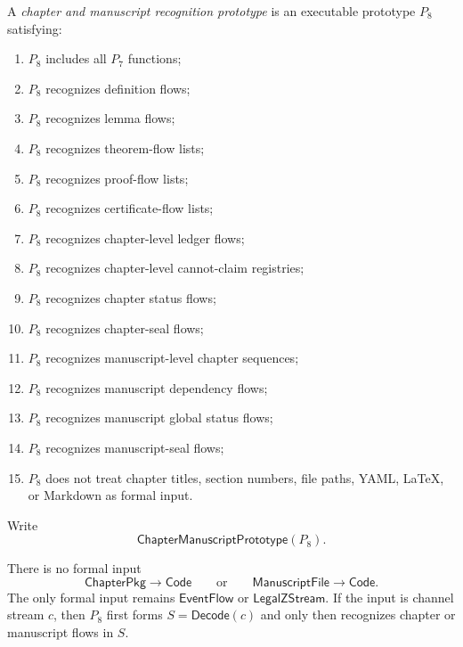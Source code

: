 \begin{definition}
\label{def:chapter-manuscript-p8-prototype}
A \emph{chapter and manuscript recognition prototype} is an executable prototype $P_8$ satisfying:
\begin{enumerate}
\item $P_8$ includes all $P_7$ functions;
\item $P_8$ recognizes definition flows;
\item $P_8$ recognizes lemma flows;
\item $P_8$ recognizes theorem-flow lists;
\item $P_8$ recognizes proof-flow lists;
\item $P_8$ recognizes certificate-flow lists;
\item $P_8$ recognizes chapter-level ledger flows;
\item $P_8$ recognizes chapter-level cannot-claim registries;
\item $P_8$ recognizes chapter status flows;
\item $P_8$ recognizes chapter-seal flows;
\item $P_8$ recognizes manuscript-level chapter sequences;
\item $P_8$ recognizes manuscript dependency flows;
\item $P_8$ recognizes manuscript global status flows;
\item $P_8$ recognizes manuscript-seal flows;
\item $P_8$ does not treat chapter titles, section numbers, file paths, YAML, LaTeX, or Markdown as formal input.
\end{enumerate}
Write
$$
  \mathsf{ChapterManuscriptPrototype}(P_8).
$$
\end{definition}

\begin{principle}
\label{prin:chapter-manuscript-not-input}
There is no formal input
$$
  \mathsf{ChapterPkg}\to\mathsf{Code}
  \qquad\text{or}\qquad
  \mathsf{ManuscriptFile}\to\mathsf{Code}.
$$
The only formal input remains $\mathsf{EventFlow}$ or $\mathsf{LegalZStream}$. If the input is channel stream $c$, then $P_8$ first forms $S=\mathsf{Decode}(c)$ and only then recognizes chapter or manuscript flows in $S$.
\end{principle}

